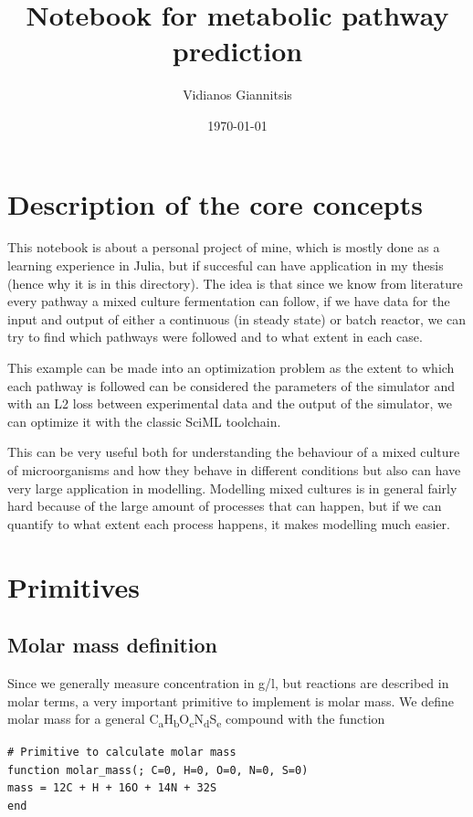 \documentclass[11pt]{article}
\author{Vidianos Giannitsis}
\date{\today}
\title{Notebook for metabolic pathway prediction}
\begin{document}
\maketitle
\tableofcontents


\section{Description of the core concepts}
\label{sec:orga9e9f91}
This notebook is about a personal project of mine, which is mostly done as a learning experience in Julia, but if succesful can have application in my thesis (hence why it is in this directory). The idea is that since we know from literature every pathway a mixed culture fermentation can follow, if we have data for the input and output of either a continuous (in steady state) or batch reactor, we can try to find which pathways were followed and to what extent in each case.

This example can be made into an optimization problem as the extent to which each pathway is followed can be considered the parameters of the simulator and with an L2 loss between experimental data and the output of the simulator, we can optimize it with the classic SciML toolchain.

This can be very useful both for understanding the behaviour of a mixed culture of microorganisms and how they behave in different conditions but also can have very large application in modelling. Modelling mixed cultures is in general fairly hard because of the large amount of processes that can happen, but if we can quantify to what extent each process happens, it makes modelling much easier.

\section{Primitives}
\label{sec:orga422e71}
\subsection{Molar mass definition}
\label{sec:org6476d80}
Since we generally measure concentration in g/l, but reactions are described in molar terms, a very important primitive to implement is molar mass. We define molar mass for a general C\textsubscript{a}H\textsubscript{b}O\textsubscript{c}N\textsubscript{d}S\textsubscript{e} compound with the function

\begin{verbatim}
# Primitive to calculate molar mass
function molar_mass(; C=0, H=0, O=0, N=0, S=0)
mass = 12C + H + 16O + 14N + 32S
end

\end{verbatim}
\end{document}
